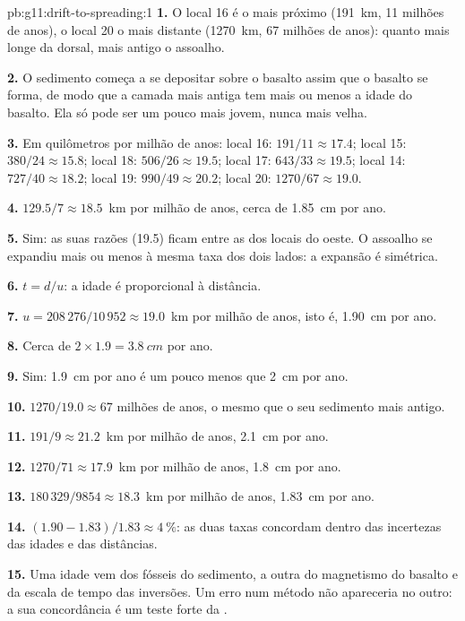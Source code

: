 \begin{solution}{pb:g11:drift-to-spreading:1}
\textbf{1.} O local 16 é o mais próximo (\qty{191}{km}, 11 milhões de
anos), o local 20 o mais distante (\qty{1270}{km}, 67 milhões de anos):
quanto mais longe da dorsal, mais antigo o assoalho.

\textbf{2.} O sedimento começa a se depositar sobre o basalto assim que o
basalto se forma, de modo que a camada mais antiga tem mais ou menos a idade
do basalto. Ela só pode ser um pouco mais jovem, nunca mais velha.

\textbf{3.} Em quilômetros por milhão de anos: local 16:
$191/11 \approx 17.4$; local 15: $380/24 \approx 15.8$; local 18: $506/26 \approx 19.5$;
local 17: $643/33 \approx 19.5$; local 14: $727/40 \approx 18.2$; local 19: $990/49
\approx 20.2$; local 20: $1270/67 \approx 19.0$.

\textbf{4.} $129.5/7 \approx \num{18.5}$~km por milhão de anos, cerca de
\qty{1.85}{cm} por ano.

\textbf{5.} Sim: as suas razões (19.5) ficam entre as dos locais do oeste. O
assoalho se expandiu mais ou menos à mesma taxa dos dois lados: a expansão é
simétrica.

\textbf{6.} $t = d/u$: a idade é proporcional à distância.

\textbf{7.} $u = 208\,276/10\,952 \approx \num{19.0}$~km por milhão de anos,
isto é, \qty{1.90}{cm} por ano.

\textbf{8.} Cerca de $2 \times 1.9 = \qty{3.8}{cm}$ por ano.

\textbf{9.} Sim: \qty{1.9}{cm} por ano é um pouco menos que \qty{2}{cm} por
ano.

\textbf{10.} $1270/19.0 \approx 67$ milhões de anos, o mesmo que o seu
sedimento mais antigo.

\textbf{11.} $191/9 \approx \num{21.2}$~km por milhão de anos,
\qty{2.1}{cm} por ano.

\textbf{12.} $1270/71 \approx \num{17.9}$~km por milhão de anos,
\qty{1.8}{cm} por ano.

\textbf{13.} $180\,329/9854 \approx \num{18.3}$~km por milhão de anos,
\qty{1.83}{cm} por ano.

\textbf{14.} $(1.90 - 1.83)/1.83 \approx \qty{4}{\percent}$: as duas taxas
concordam dentro das incertezas das idades e das distâncias.

\textbf{15.} Uma idade vem dos fósseis do sedimento, a outra do magnetismo
do basalto e da escala de tempo das inversões. Um erro num método não
apareceria no outro: a sua concordância é um teste forte da .


\end{solution}
